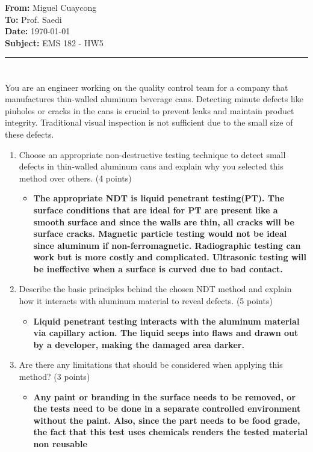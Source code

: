 \documentclass[11pt]{article}
\newcommand{\memoheader}[4]{
  \noindent
  \textbf{From:} #2\\ 
  \textbf{To:} #1\\
  \textbf{Date:} #3\\
  \textbf{Subject:} #4\\[1ex]\hrule\vspace{1.5ex}
}
\begin{document}
\memoheader{Prof. Saedi}
            {Miguel Cuaycong}
            {\today}
            {EMS 182 - HW5}

\section{}
You are an engineer working on the quality control team for a company that manufactures thin-walled aluminum beverage cans. Detecting minute defects like pinholes or cracks in the cans is crucial to prevent leaks and maintain product integrity. Traditional visual inspection is not sufficient due to the small size of these defects. 
\begin{enumerate}
    \item Choose an appropriate non-destructive testing technique to detect small defects in thin-walled aluminum cans and explain why you selected this method over others. (4 points)
    \begin{itemize}
        \item \textbf{The appropriate NDT is liquid penetrant testing(PT). The surface conditions that are ideal for PT are present like a smooth surface and since the walls are thin, all cracks will be surface cracks. Magnetic particle testing would not be ideal since aluminum if non-ferromagnetic. Radiographic testing can work but is more costly and complicated. Ultrasonic testing will be ineffective when a surface is curved due to bad contact.} 
    \end{itemize}
    \item Describe the basic principles behind the chosen NDT method and explain how it interacts with aluminum material to reveal defects. (5 points)
    \begin{itemize}
        \item \textbf{Liquid penetrant testing interacts with the aluminum material via capillary action. The liquid seeps into flaws and drawn out by a developer, making the damaged area darker.}
    \end{itemize}
    \item Are there any limitations that should be considered when applying this method? (3 points)
    \begin{itemize}
        \item \textbf{Any paint or branding in the surface needs to be removed, or the tests need to be done in a separate controlled environment without the paint. Also, since the part needs to be food grade, the fact that this test uses chemicals renders the tested material non reusable}
    \end{itemize}
\end{enumerate}
\end{document}
